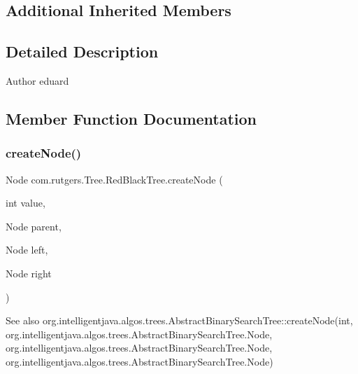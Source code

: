 \subsection*{Additional Inherited Members}


\subsection{Detailed Description}
\begin{DoxyAuthor}{Author}
eduard 
\end{DoxyAuthor}


\subsection{Member Function Documentation}
\mbox{\label{classcom_1_1rutgers_1_1Tree_1_1RedBlackTree_a44da4e60e7dafdf6e5d290be07ee4c8a}} 
\subsubsection{\texorpdfstring{create\+Node()}{createNode()}}
{\footnotesize\ttfamily Node com.\+rutgers.\+Tree.\+Red\+Black\+Tree.\+create\+Node (\begin{DoxyParamCaption}\item[{int}]{value,  }\item[{Node}]{parent,  }\item[{Node}]{left,  }\item[{Node}]{right }\end{DoxyParamCaption})\hspace{0.3cm}{\ttfamily [protected]}}

\begin{DoxySeeAlso}{See also}
org.\+intelligentjava.\+algos.\+trees.\+Abstract\+Binary\+Search\+Tree\+::create\+Node(int, org.\+intelligentjava.\+algos.\+trees.\+Abstract\+Binary\+Search\+Tree.\+Node, org.\+intelligentjava.\+algos.\+trees.\+Abstract\+Binary\+Search\+Tree.\+Node, org.\+intelligentjava.\+algos.\+trees.\+Abstract\+Binary\+Search\+Tree.\+Node) 
\end{DoxySeeAlso}
\mbox{\label{classcom_1_1rutgers_1_1Tree_1_1RedBlackTree_a32edb63c284dad19e7feb2c8ae61366d}} 
